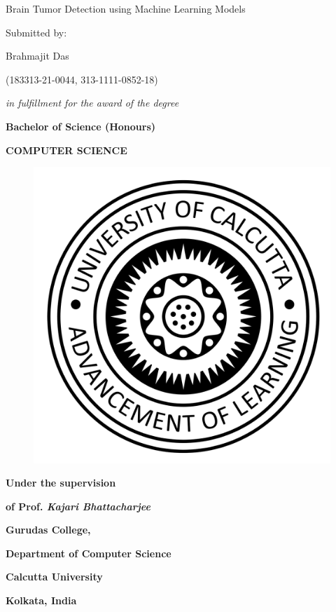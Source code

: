 \begin{titlepage}


	\begin{center}
		\Huge Brain Tumor Detection using Machine Learning Models

		\vspace{1cm}
		\Large Submitted by:

		\vspace{0.5cm}
		Brahmajit Das

		(183313-21-0044, 313-1111-0852-18)

		\vspace{1cm}
		\textit{ in fulfillment for the award of the degree }

		\vspace{0.5cm}
		\textbf{Bachelor of Science (Honours)}

		\vspace{0.5cm}
		\textbf{COMPUTER SCIENCE}

		\begin{figure}[h]
			\centering
			\includegraphics[width=0.4\linewidth]{imgs/cu_logo.png}
			\caption*{}%
			\label{fig:first_page_logo}
		\end{figure}

		\vfill
		\textbf{Under the supervision}

		\vspace{0.5cm}
		\textbf{of Prof. \textit{Kajari Bhattacharjee }}

		\vspace{0.5cm}
		\textbf{Gurudas College,}

		\textbf{Department of Computer Science}

		\vspace{0.5cm}
		\textbf{Calcutta University}

		\vspace{0.5cm}
		\textbf{Kolkata, India}
	\end{center}

\end{titlepage}
